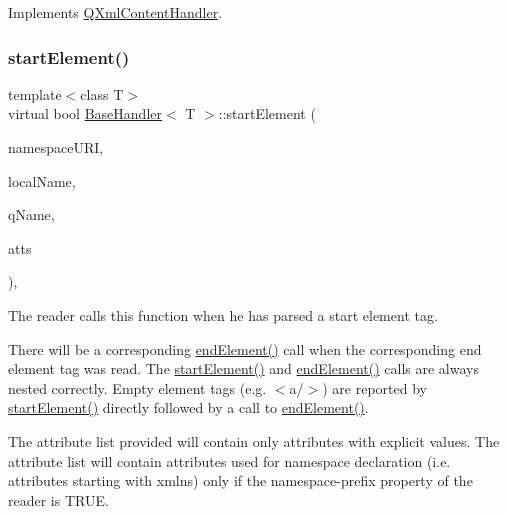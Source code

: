 Implements \mbox{\hyperlink{class_q_xml_content_handler_aaca36268e66c9a56257e38bce18ae4d2}{Q\+Xml\+Content\+Handler}}.

\mbox{\label{class_base_handler_a15c20baf7065b3eb92ae7a336ccdf20b}} 
\subsubsection{\texorpdfstring{startElement()}{startElement()}}
{\footnotesize\ttfamily template$<$class T$>$ \\
virtual bool \mbox{\hyperlink{class_base_handler}{Base\+Handler}}$<$ T $>$\+::start\+Element (\begin{DoxyParamCaption}\item[{const \mbox{\hyperlink{class_q_string}{Q\+String}} \&}]{namespace\+U\+RI,  }\item[{const \mbox{\hyperlink{class_q_string}{Q\+String}} \&}]{local\+Name,  }\item[{const \mbox{\hyperlink{class_q_string}{Q\+String}} \&}]{q\+Name,  }\item[{const \mbox{\hyperlink{class_q_xml_attributes}{Q\+Xml\+Attributes}} \&}]{atts }\end{DoxyParamCaption})\hspace{0.3cm}{\ttfamily [inline]}, {\ttfamily [virtual]}}

The reader calls this function when he has parsed a start element tag.

There will be a corresponding \mbox{\hyperlink{class_base_handler_aa1b987506d2f962ba478b8bab388bff9}{end\+Element()}} call when the corresponding end element tag was read. The \mbox{\hyperlink{class_base_handler_a15c20baf7065b3eb92ae7a336ccdf20b}{start\+Element()}} and \mbox{\hyperlink{class_base_handler_aa1b987506d2f962ba478b8bab388bff9}{end\+Element()}} calls are always nested correctly. Empty element tags (e.\+g. $<$a/$>$) are reported by \mbox{\hyperlink{class_base_handler_a15c20baf7065b3eb92ae7a336ccdf20b}{start\+Element()}} directly followed by a call to \mbox{\hyperlink{class_base_handler_aa1b987506d2f962ba478b8bab388bff9}{end\+Element()}}.

The attribute list provided will contain only attributes with explicit values. The attribute list will contain attributes used for namespace declaration (i.\+e. attributes starting with xmlns) only if the namespace-\/prefix property of the reader is T\+R\+UE.

